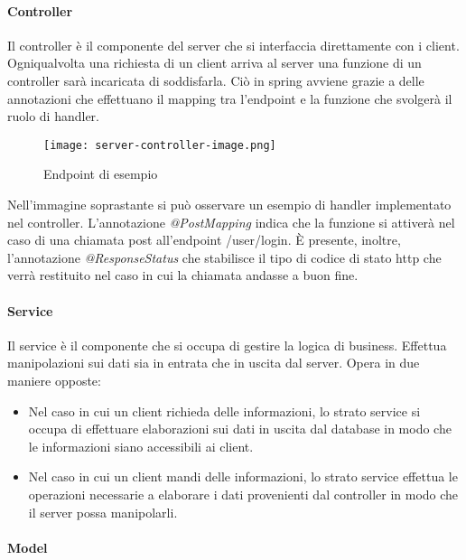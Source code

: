 \documentclass[../../manuale-manutentore.tex]{subfiles}
\begin{document}
\paragraph{Controller}%
\label{par:controller}

Il controller è il componente del server che si interfaccia direttamente con i client.
Ogniqualvolta una richiesta di un client arriva al server una funzione di un controller sarà incaricata di soddisfarla.
Ciò in spring avviene grazie a delle annotazioni che effettuano il mapping tra l'endpoint e la funzione che svolgerà il ruolo di handler.

\begin{figure}[H]
  \centering
  \texttt{[image: server-controller-image.png]}
  \caption{Endpoint di esempio}%
   \label{fig:immagine che illustra un endpoint di esempio}
\end{figure}

Nell'immagine soprastante si può osservare un esempio di handler implementato nel controller.
L'annotazione \textit{@PostMapping} indica che la funzione si attiverà nel caso di una chiamata post all'endpoint /user/login.
È presente, inoltre, l'annotazione \textit{@ResponseStatus} che stabilisce il tipo di codice di stato http che verrà restituito nel caso in cui la chiamata andasse a buon fine.

\paragraph{Service}%
\label{par:service}

Il service è il componente che si occupa di gestire la logica di business.
Effettua manipolazioni sui dati sia in entrata che in uscita dal server.
Opera in due maniere opposte:
\begin{itemize}
  \item Nel caso in cui un client richieda delle informazioni, lo strato service si occupa di effettuare elaborazioni sui dati in uscita dal database in modo che le informazioni siano accessibili ai client.
  \item Nel caso in cui un client mandi delle informazioni, lo strato service effettua le operazioni necessarie a elaborare i dati provenienti dal controller in modo che il server possa manipolarli.
\end{itemize}

\paragraph{Model}%
\label{par:model}
\end{document}
